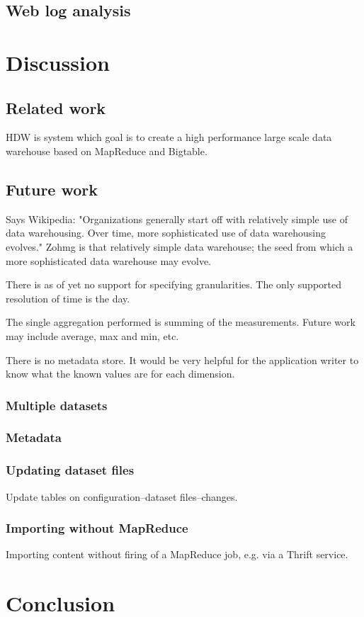 \documentclass[a4paper,10pt]{book}
\begin{document}
\section{Web log analysis}



\chapter{Discussion}

\section{Related work}

HDW is system which goal is to create a high performance large scale data
warehouse based on MapReduce and Bigtable. \cite{hdw}


\section{Future work}

Says Wikipedia: "Organizations generally start off with relatively simple use of data warehousing. Over time, more sophisticated use of data warehousing evolves." Zohmg is that relatively simple data warehouse; the seed from which a more sophisticated data warehouse may evolve.

There is as of yet no support for specifying granularities. The only supported resolution of time is the day.

The single aggregation performed is summing of the measurements. Future work may include average, max and min, etc.

There is no metadata store. It would be very helpful for the application writer to know what the known values are for each dimension.

\subsection{Multiple datasets}

\subsection{Metadata}

\subsection{Updating dataset files}

Update tables on configuration--dataset files--changes.

\subsection{Importing without MapReduce}

Importing content without firing of a MapReduce job, e.g. via a Thrift
service.



\chapter{Conclusion}



\pagebreak



 
\end{document}
